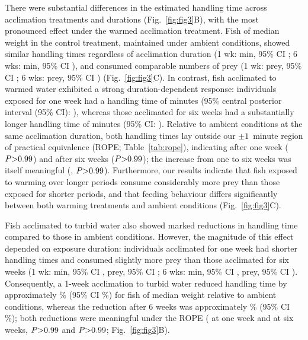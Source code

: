 \documentclass[ASNA,twocolumn]{USG} %
\begin{document}
There were substantial differences in the estimated handling time across acclimation treatments and durations (Fig.~\ref{fig:fig3}B), with the most pronounced effect under the warmed acclimation treatment. Fish of median weight in the control treatment, maintained under ambient conditions, showed similar handling times regardless of acclimation duration (1 wk: \HtAmbOne{} min, 95\% CI \HtAmbOneCI; 6 wks: \HtAmbSix{} min, 95\% CI \HtAmbSixCI), and consumed comparable numbers of prey (1 wk: \EatAmbOne{} prey, 95\% CI \EatAmbOneCI; 6 wks: \EatAmbSix{} prey, 95\% CI \EatAmbSixCI) (Fig.~\ref{fig:fig3}C). In contrast, fish acclimated to warmed water exhibited a strong duration-dependent response: individuals exposed for one week had a handling time of \HtWarmOne{} minutes (95\% central posterior interval (95\% CI): \HtWarmOneCI), whereas those acclimated for six weeks had a substantially longer handling time of \HtWarmSix{} minutes (95\% CI: \HtWarmSixCI). Relative to ambient conditions at the same acclimation duration, both handling times lay outside our $\pm1$~minute region of practical equivalence (ROPE; Table~\ref{tab:rope}), indicating \vRopeWarmOne{} after one week ($P{>}0.99$) and \vRopeWarmSix{} after six weeks ($P{>}0.99$); the increase from one to six weeks was itself meaningful (\vRopeWarmDur, $P{>}0.99$). Furthermore, our results indicate that fish exposed to warming over longer periods consume considerably more prey than those exposed for shorter periods, and that feeding behaviour differs significantly between both warming treatments and ambient conditions (Fig.~\ref{fig:fig3}C).

Fish acclimated to turbid water also showed marked reductions in handling time compared to those in ambient conditions. However, the magnitude of this effect depended on exposure duration: individuals acclimated for one week had shorter handling times and consumed slightly more prey than those acclimated for six weeks (1 wk: \HtTurbOne{} min, 95\% CI \HtTurbOneCI, \EatTurbOne{} prey, 95\% CI \EatTurbOneCI; 6 wks: \HtTurbSix{} min, 95\% CI \HtTurbSixCI, \EatTurbSix{} prey, 95\% CI \EatTurbSixCI). Consequently, a 1-week acclimation to turbid water reduced handling time by approximately \RedTurbOne\% (95\% CI \RedTurbOneCI\%) for fish of median weight relative to ambient conditions, whereas the reduction after 6 weeks was approximately \RedTurbSix\% (95\% CI \RedTurbSixCI\%); both reductions were meaningful under the ROPE (\vRopeTurbOne{} at one week and \vRopeTurbSix{} at six weeks, $P{>}0.99$ and $P{>}0.99$; Fig.~\ref{fig:fig3}B).
\end{document}
